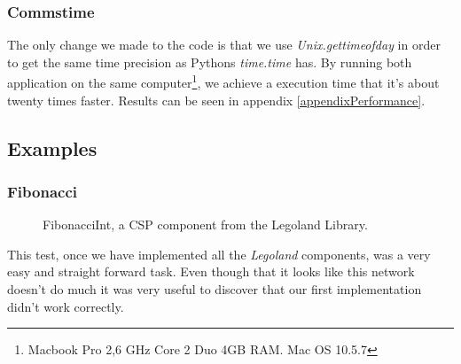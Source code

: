 \documentclass[a4paper,12pt]{article}
\begin{document}
\subsubsection{Commstime}
The only change we made to the code is that we use {\it Unix.gettimeofday} in
order to get the same time precision as Pythons {\it time.time} has. By running
both application on the same computer\footnote{Macbook Pro 2,6 GHz Core 2 Duo
4GB RAM. Mac OS 10.5.7}, we achieve a execution time that it's about twenty
times faster. Results can be seen in appendix \ref{appendixPerformance}.

\subsection{Examples}
\label{examples}

\subsubsection{Fibonacci}
\begin{figure}[h]
  \begin{center}
  \end{center}
  \caption{FibonacciInt, a CSP component from the Legoland Library.}
  \label{fibonaccicomp}
\end{figure}

This test, once we have implemented all the {\it Legoland}\cite{vintercsp}
components, was a very easy and straight forward task. Even though that it
looks like this network doesn't do much it was very useful to discover that
our first implementation didn't work correctly.
\end{document}
